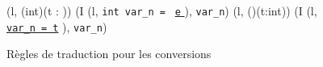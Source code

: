 \begin{figure*}[h!]
  \scriptsize{
    {
      {
        (l, (int)(t : )) 
        (I \concat (l,
        \mbox{\lstinline'int var_n ='}~
        \underline{\mbox{\lstinline'e'} \Zclear}
        \semicolon
        ), \mbox{\lstinline'var_n'})
      }
    }
    {
      {(l, ()(t:int))  (I \concat (l,
        \underline{\Zinit \mbox{\lstinline'var_n = t'}}
        \semicolon
        ), \mbox{\lstinline'var_n'})}
    }
  }
  \caption{Règles de traduction pour les conversions}
  \label{fig:coerce}
\end{figure*}

